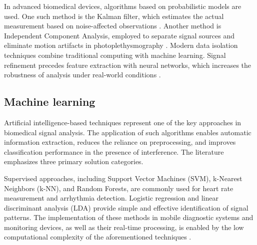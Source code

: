 \documentclass[journal]{IEEEtran}
\begin{document}
In advanced biomedical devices, algorithms based on probabilistic models are used. One such method is the Kalman filter, which estimates the actual measurement based on noise-affected observations \cite{8}. Another method is Independent Component Analysis, employed to separate signal sources and eliminate motion artifacts in photoplethysmography \cite{9}. Modern data isolation techniques combine traditional computing with machine learning. Signal refinement precedes feature extraction with neural networks, which increases the robustness of analysis under real-world conditions \cite{10}.

\subsection{Machine learning}
Artificial intelligence-based techniques represent one of the key approaches in biomedical signal analysis. The application of such algorithms enables automatic information extraction, reduces the reliance on preprocessing, and improves classification performance in the presence of interference. The literature emphasizes three primary solution categories.

Supervised approaches, including Support Vector Machines (SVM), k-Nearest Neighbors (k-NN), and Random Forests, are commonly used for heart rate measurement and arrhythmia detection. Logistic regression and linear discriminant analysis (LDA) provide simple and effective identification of signal patterns. The implementation of these methods in mobile diagnostic systems and monitoring devices, as well as their real-time processing, is enabled by the low computational complexity of the aforementioned techniques \cite{11}.
\end{document}
